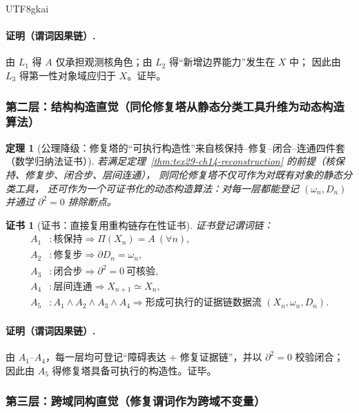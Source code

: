 \documentclass[12pt]{article}
\newtheorem{theorem}{定理}[section]
\newtheorem{Certificate}{证书}[section]
\begin{document}
\begin{CJK*}{UTF8}{gkai}
\paragraph{证明（谓词因果链）.}
由 $L_1$ 得 $A$ 仅承担观测核角色；由 $L_2$ 得“新增边界能力”发生在 $X$ 中；
因此由 $L_3$ 得第一性对象域应归于 $X$。证毕。

\subsubsection{第二层：结构构造直觉（同伦修复塔从静态分类工具升维为动态构造算法）}
\label{subsubsec:tex29-ch15-level2}

\begin{theorem}[公理降级：修复塔的“可执行构造性”来自核保持--修复--闭合--连通四件套（数学归纳法证书）]
\label{thm:tex29-ch15-level2}
若满足定理~\ref{thm:tex29-ch14-reconstruction} 的前提（核保持、修复步、闭合步、层间连通），
则同伦修复塔不仅可作为对既有对象的静态分类工具，
还可作为一个可证书化的动态构造算法：对每一层都能登记 $(\omega_n,D_n)$ 并通过 $\partial^2=0$ 排除断点。
\end{theorem}

\begin{Certificate}[证书：直接复用重构链存在性证书]
\label{cert:tex29-ch15-level2}
证书登记谓词链：
\[
\begin{aligned}
  A_1 &: \text{核保持}\Rightarrow \Pi(X_n)=A\ (\forall n),\\
  A_2 &: \text{修复步}\Rightarrow \partial D_n=\omega_n,\\
  A_3 &: \text{闭合步}\Rightarrow \partial^2=0\ \text{可核验},\\
  A_4 &: \text{层间连通}\Rightarrow X_{n+1}\simeq X_n,\\
  A_5 &: A_1\wedge A_2\wedge A_3\wedge A_4\Rightarrow \text{形成可执行的证据链数据流 }(X_n,\omega_n,D_n).
\end{aligned}
\]
\end{Certificate}

\paragraph{证明（谓词因果链）.}
由 $A_1$--$A_4$，每一层均可登记“障碍表达 + 修复证据链”，并以 $\partial^2=0$ 校验闭合；
因此由 $A_5$ 得修复塔具备可执行的构造性。证毕。

\subsubsection{第三层：跨域同构直觉（修复谓词作为跨域不变量）}
\label{subsubsec:tex29-ch15-level3}


\end{CJK*}
\end{document}
